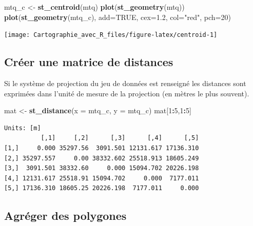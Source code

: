 \documentclass[]{book}
\newenvironment{Shaded}{\begin{snugshade}}{\end{snugshade}}
\newcommand{\KeywordTok}[1]{\textcolor[rgb]{0.13,0.29,0.53}{\textbf{#1}}}
\newcommand{\DataTypeTok}[1]{\textcolor[rgb]{0.13,0.29,0.53}{#1}}
\newcommand{\DecValTok}[1]{\textcolor[rgb]{0.00,0.00,0.81}{#1}}
\newcommand{\FloatTok}[1]{\textcolor[rgb]{0.00,0.00,0.81}{#1}}
\newcommand{\StringTok}[1]{\textcolor[rgb]{0.31,0.60,0.02}{#1}}
\newcommand{\OtherTok}[1]{\textcolor[rgb]{0.56,0.35,0.01}{#1}}
\newcommand{\OperatorTok}[1]{\textcolor[rgb]{0.81,0.36,0.00}{\textbf{#1}}}
\newcommand{\NormalTok}[1]{#1}
\begin{document}
\begin{Shaded}
\begin{Highlighting}[]
\NormalTok{mtq_c <-}\StringTok{ }\KeywordTok{st_centroid}\NormalTok{(mtq)}
\KeywordTok{plot}\NormalTok{(}\KeywordTok{st_geometry}\NormalTok{(mtq))}
\KeywordTok{plot}\NormalTok{(}\KeywordTok{st_geometry}\NormalTok{(mtq_c), }\DataTypeTok{add=}\OtherTok{TRUE}\NormalTok{, }\DataTypeTok{cex=}\FloatTok{1.2}\NormalTok{, }\DataTypeTok{col=}\StringTok{"red"}\NormalTok{, }\DataTypeTok{pch=}\DecValTok{20}\NormalTok{)}
\end{Highlighting}
\end{Shaded}

\begin{center}\texttt{[image: Cartographie\_avec\_R\_files/figure-latex/centroid-1]} \end{center}

\subsection{Créer une matrice de
distances}\label{creer-une-matrice-de-distances}

Si le système de projection du jeu de données est renseigné les
distances sont exprimées dans l'unité de mesure de la projection (en
mètres le plus souvent).

\begin{Shaded}
\begin{Highlighting}[]
\NormalTok{mat <-}\StringTok{ }\KeywordTok{st_distance}\NormalTok{(}\DataTypeTok{x =}\NormalTok{ mtq_c, }\DataTypeTok{y =}\NormalTok{ mtq_c)}
\NormalTok{mat[}\DecValTok{1}\OperatorTok{:}\DecValTok{5}\NormalTok{,}\DecValTok{1}\OperatorTok{:}\DecValTok{5}\NormalTok{]}
\end{Highlighting}
\end{Shaded}

\begin{verbatim}
Units: [m]
          [,1]     [,2]      [,3]      [,4]      [,5]
[1,]     0.000 35297.56  3091.501 12131.617 17136.310
[2,] 35297.557     0.00 38332.602 25518.913 18605.249
[3,]  3091.501 38332.60     0.000 15094.702 20226.198
[4,] 12131.617 25518.91 15094.702     0.000  7177.011
[5,] 17136.310 18605.25 20226.198  7177.011     0.000
\end{verbatim}

\subsection{Agréger des polygones}\label{agreger-des-polygones}
\end{document}
